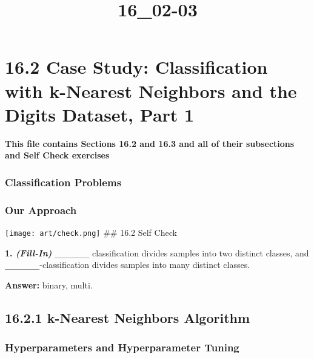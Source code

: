 \documentclass[11pt]{article}
\title{16\_02-03}
\makeatletter
\def\maxwidth{\ifdim\Gin@nat@width>\linewidth\linewidth
    \else\Gin@nat@width\fi}
\let\Oldincludegraphics\includegraphics
\renewcommand{\includegraphics}[1]{\Oldincludegraphics[width=.8\maxwidth]{#1}}
\makeatother
\begin{document}
    
    
    \maketitle
    
    

    
    \hypertarget{case-study-classification-with-k-nearest-neighbors-and-the-digits-dataset-part-1}{%
\section{16.2 Case Study: Classification with k-Nearest Neighbors and
the Digits Dataset, Part
1}\label{case-study-classification-with-k-nearest-neighbors-and-the-digits-dataset-part-1}}

\textbf{This file contains Sections 16.2 and 16.3 and all of their
subsections and Self Check exercises}

\hypertarget{classification-problems}{%
\subsubsection{Classification Problems}\label{classification-problems}}

\hypertarget{our-approach}{%
\subsubsection{Our Approach}\label{our-approach}}

    \texttt{[image: art/check.png]} \#\# 16.2 Self Check

\textbf{1. \emph{(Fill-In)}} \texttt{\_\_\_\_\_\_\_\_} classification
divides samples into two distinct classes, and
\texttt{\_\_\_\_\_\_\_\_}-classification divides samples into many
distinct classes.

\textbf{Answer:} binary, multi.

    \hypertarget{k-nearest-neighbors-algorithm}{%
\subsection{16.2.1 k-Nearest Neighbors
Algorithm}\label{k-nearest-neighbors-algorithm}}

\hypertarget{hyperparameters-and-hyperparameter-tuning}{%
\subsubsection{Hyperparameters and Hyperparameter
Tuning}\label{hyperparameters-and-hyperparameter-tuning}}
\end{document}
